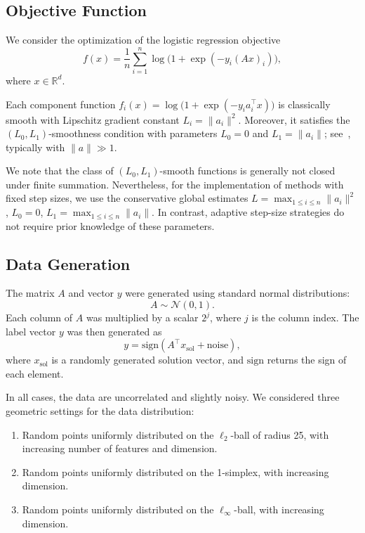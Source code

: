 \documentclass[runningheads]{llncs}
\begin{document}
	\subsection{Objective Function}
	We consider the optimization of the logistic regression objective
	\[
	f(x) = \frac{1}{n} \sum_{i=1}^n \log\big(1 + \exp(-y_i (A x)_i)\big),
	\]
	where \(x \in \mathbb{R}^d\). 
	
	Each component function $f_i(x) = \log\bigl(1 + \exp(-y_i a_i^\top x)\bigr)$
	is classically smooth with Lipschitz gradient constant \(L_i = \|a_i\|^2\). Moreover, it satisfies the \((L_0,L_1)\)-smoothness condition with parameters \(L_0 = 0\) and \(L_1 = \|a_i\|\); see~\cite{gorbunov2024methods}, typically with \(\|a\| \gg 1\).
	
	We note that the class of \((L_0,L_1)\)-smooth functions is generally not closed under finite summation. Nevertheless, for the implementation of methods with fixed step sizes, we use the conservative global estimates
	$L = \max_{1 \leq i \leq n} \|a_i\|^2$, $L_0 = 0$, $L_1 = \max_{1 \leq i \leq n} \|a_i\|$. In contrast, adaptive step-size strategies do not require prior knowledge of these parameters. 
	
	\subsection{Data Generation}
	The matrix \(A\) and vector \(y\) were generated using standard normal distributions:
	\[
	A \sim \mathcal{N}(0, 1).
	\]
	Each column of \(A\) was multiplied by a scalar \(2^j\), where \(j\) is the column index.  
	The label vector \(y\) was then generated as
	\[
	y = \mathrm{sign}(A^\top x_{\mathrm{sol}} + \mathrm{noise}),
	\]
	where \(x_{\mathrm{sol}}\) is a randomly generated solution vector, and \(\mathrm{sign}\) returns the sign of each element.
	
	In all cases, the data are uncorrelated and slightly noisy.  
	We considered three geometric settings for the data distribution:
	
	\begin{enumerate}
		\item Random points uniformly distributed on the $\ell_2$-ball of radius 25, with increasing number of features and dimension.  
		\item Random points uniformly distributed on the 1-simplex, with increasing dimension.  
		\item Random points uniformly distributed on the $\ell_\infty$-ball, with increasing dimension.
	\end{enumerate}
	
\end{document}
